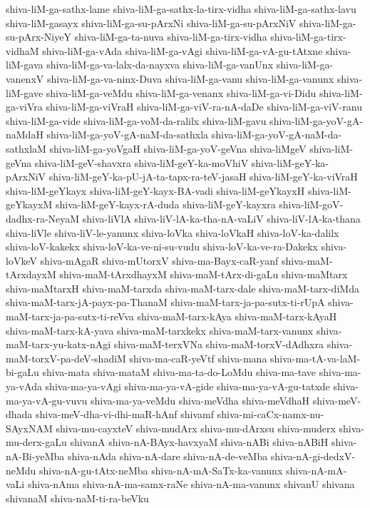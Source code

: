 {shiva-liM-ga-sathx-lame
shiva-liM-ga-sathx-la-tirx-vidha
shiva-liM-ga-sathx-lavu
shiva-liM-gasayx
shiva-liM-ga-su-pArxNi
shiva-liM-ga-su-pArxNiV
shiva-liM-ga-su-pArx-NiyeY
shiva-liM-ga-ta-nuva
shiva-liM-ga-tirx-vidha
shiva-liM-ga-tirx-vidhaM
shiva-liM-ga-vAda
shiva-liM-ga-vAgi
shiva-liM-ga-vA-gu-tAtxne
shiva-liM-gava
shiva-liM-ga-va-lalx-da-nayxva
shiva-liM-ga-vanUnx
shiva-liM-ga-vanenxV
shiva-liM-ga-va-ninx-Duva
shiva-liM-ga-vanu
shiva-liM-ga-vanunx
shiva-liM-gave
shiva-liM-ga-veMdu
shiva-liM-ga-venanx
shiva-liM-ga-vi-Didu
shiva-liM-ga-viVra
shiva-liM-ga-viVraH
shiva-liM-ga-viV-ra-nA-daDe
shiva-liM-ga-viV-ranu
shiva-liM-ga-vide
shiva-liM-ga-voM-da-ralilx
shiva-liM-gavu
shiva-liM-ga-yoV-gA-naMdaH
shiva-liM-ga-yoV-gA-naM-da-sathxla
shiva-liM-ga-yoV-gA-naM-da-sathxlaM
shiva-liM-ga-yoVgaH
shiva-liM-ga-yoV-geVna
shiva-liMgeV
shiva-liM-geVna
shiva-liM-geV-shavxra
shiva-liM-geY-ka-moVhiV
shiva-liM-geY-ka-pArxNiV
shiva-liM-geY-ka-pU-jA-ta-tapx-ra-teV-jasaH
shiva-liM-geY-ka-viVraH
shiva-liM-geYkayx
shiva-liM-geY-kayx-BA-vadi
shiva-liM-geYkayxH
shiva-liM-geYkayxM
shiva-liM-geY-kayx-rA-duda
shiva-liM-geY-kayxra
shiva-liM-goV-dadhx-ra-NeyaM
shiva-liVlA
shiva-liV-lA-ka-tha-nA-vaLiV
shiva-liV-lA-ka-thana
shiva-liVle
shiva-liV-le-yanunx
shiva-loVka
shiva-loVkaH
shiva-loV-ka-dalilx
shiva-loV-kakekx
shiva-loV-ka-ve-ni-su-vudu
shiva-loV-ka-ve-ra-Dakekx
shiva-loVkeV
shiva-mAgaR
shiva-mUtorxV
shiva-ma-Bayx-caR-yanf
shiva-maM-tArxdayxM
shiva-maM-tArxdhayxM
shiva-maM-tArx-di-gaLu
shiva-maMtarx
shiva-maMtarxH
shiva-maM-tarxda
shiva-maM-tarx-dale
shiva-maM-tarx-diMda
shiva-maM-tarx-jA-payx-pa-ThanaM
shiva-maM-tarx-ja-pa-sutx-ti-rUpA
shiva-maM-tarx-ja-pa-sutx-ti-reVva
shiva-maM-tarx-kAya
shiva-maM-tarx-kAyaH
shiva-maM-tarx-kA-yava
shiva-maM-tarxkekx
shiva-maM-tarx-vanunx
shiva-maM-tarx-yu-katx-nAgi
shiva-maM-terxVNa
shiva-maM-torxV-dAdhxra
shiva-maM-torxV-pa-deV-shadiM
shiva-ma-caR-yeVtf
shiva-mana
shiva-ma-tA-va-laM-bi-gaLu
shiva-mata
shiva-mataM
shiva-ma-ta-do-LoMdu
shiva-ma-tave
shiva-ma-ya-vAda
shiva-ma-ya-vAgi
shiva-ma-ya-vA-gide
shiva-ma-ya-vA-gu-tatxde
shiva-ma-ya-vA-gu-vuvu
shiva-ma-ya-veMdu
shiva-meVdha
shiva-meVdhaH
shiva-meV-dhada
shiva-meV-dha-vi-dhi-maR-hAnf
shivamf
shiva-mi-caCx-namx-nu-SAyxNAM
shiva-mu-cayxteV
shiva-mudArx
shiva-mu-dArxsu
shiva-muderx
shiva-mu-derx-gaLu
shivanA
shiva-nA-BAyx-havxyaM
shiva-nABi
shiva-nABiH
shiva-nA-Bi-yeMba
shiva-nAda
shiva-nA-dare
shiva-nA-de-veMba
shiva-nA-gi-dedxV-neMdu
shiva-nA-gu-tAtx-neMba
shiva-nA-mA-SaTx-ka-vanunx
shiva-nA-mA-vaLi
shiva-nAma
shiva-nA-ma-samx-raNe
shiva-nA-ma-vanunx
shivanU
shivana
shivanaM
shiva-naM-ti-ra-beVku
}
